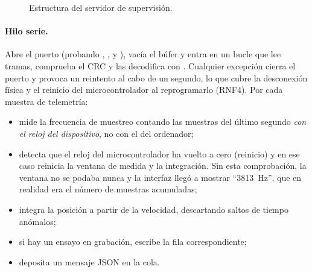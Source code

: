 \begin{figure}[H]
\centering
{}
\caption{Estructura del servidor de supervisión.}
\label{fig:servidor}
\end{figure}

\paragraph{Hilo serie.} Abre el puerto (probando , ,
 y ), vacía el búfer y entra en un bucle que lee tramas,
comprueba el CRC y las decodifica con . Cualquier excepción cierra el puerto y
provoca un reintento al cabo de un segundo, lo que cubre la desconexión física y el reinicio del
microcontrolador al reprogramarlo (RNF4). Por cada muestra de telemetría:
\begin{itemize}
  \item mide la frecuencia de muestreo contando las muestras del último segundo \emph{con el reloj
        del dispositivo}, no con el del ordenador;
  \item detecta que el reloj del microcontrolador ha vuelto a cero (reinicio) y en ese caso reinicia
        la ventana de medida y la integración. Sin esta comprobación, la ventana no se podaba nunca y
        la interfaz llegó a mostrar ``\SI{3813}{\hertz}'', que en realidad era el número de muestras
        acumuladas;
  \item integra la posición a partir de la velocidad, descartando saltos de tiempo anómalos;
  \item si hay un ensayo en grabación, escribe la fila correspondiente;
  \item deposita un mensaje JSON en la cola.
\end{itemize}

